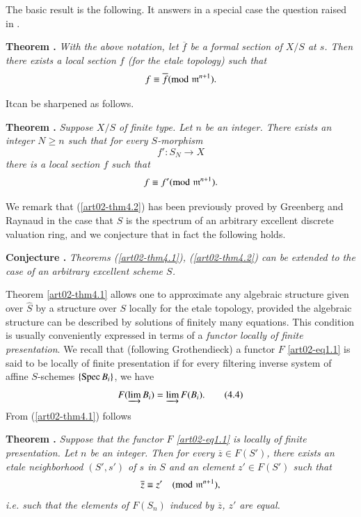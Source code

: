 The basic result is the following. It answers in a special case the question raised in \cite{art02-key3}.

\medskip
\noindent
{\bf Theorem .\label{art02-thm4.1}}
{\em With the above notation, let $\overline{f}$ be a formal section of $X/S$ at $s$. Then there exists a local section $f$ (for the etale topology) such that}
$$
f\equiv \overline{f}({\rm{mod}}\kern.3em \mathfrak{m}^{n+1}).
$$
\smallskip

It\pageoriginale can be sharpened as follows.

\medskip
\noindent
{\bf Theorem .\label{art02-thm4.2}}
{\em Suppose $X/S$ of finite type. Let $n$ be an integer. There exists an integer $N\geq n$ such that for every $S$-morphism}
$$
f':S_{N}\to X
$$
{\em there is a local section $f$ such that}
$$
f\equiv f'({\rm{mod}}\kern.3em \mathfrak{m}^{n+1}).
$$

We remark that (\ref{art02-thm4.2}) has been previously proved by Greenberg \cite{art02-key10} and Raynaud in the case that $S$ is the spectrum of an arbitrary excellent discrete valuation ring, and we conjecture that in fact the following holds.

\medskip
\noindent
{\bf Conjecture .\label{art02-conj4.3}}
{\em Theorems (\ref{art02-thm4.1}), (\ref{art02-thm4.2}) can be extended to the case of an arbitrary excellent scheme $S$.}
\smallskip

Theorem \ref{art02-thm4.1} allows one to approximate any algebraic structure given over $\widehat{S}$ by a structure over $S$ locally for the etale topology, provided the algebraic structure can be described by solutions of finitely many equations. This condition is usually conveniently expressed in terms of a {\em functor locally of finite presentation}. We recall that (following Grothendieck) a functor $F$ \eqref{art02-eq1.1} is said to be locally of finite presentation if for every filtering inverse system of affine $S$-schemes $\{\operatorname{Spec} B_{i}\}$, we have
\begin{equation*}
F(\varinjlim B_{i})=\varinjlim F(B_{i}).\tag{4.4}\label{art02-eq4.4}
\end{equation*}
From (\ref{art02-thm4.1}) follows

\medskip
\noindent
{\bf Theorem .\label{art02-thm4.5}}
{\em Suppose that the functor $F$ \eqref{art02-eq1.1} is locally of finite presentation. Let $n$ be an integer. Then for every $\overline{z}\in F(S')$, there exists an etale neighborhood $(S',s')$ of $s$ in $S$ and an element $z'\in F(S')$ such that}
$$
\overline{z}\equiv z'\quad ({\rm{mod}}\kern.3em \mathfrak{m}^{n+1}),
$$
{\em i.e. such that the elements of $F(S_{n})$ induced by $\overline{z}$, $z'$ are equal.}
\medskip

